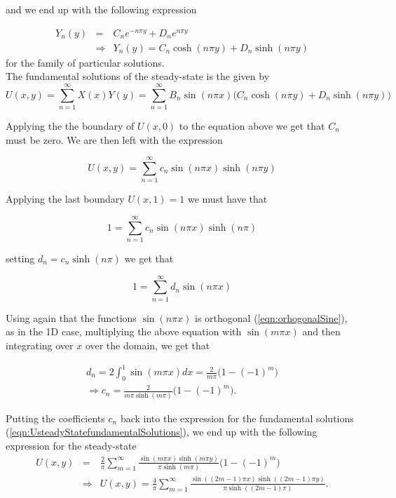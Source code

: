 \documentclass{article}
\begin{document}
and we end up with the following expression

\begin{eqnarray}
Y_n(y) &=& C_ne^{-n\pi y} + D_ne^{n\pi y} \\ 
&\Rightarrow & Y_n(y) = C_n\cosh(n\pi y) + D_n\sinh(n\pi y)
\end{eqnarray}
for the family of particular solutions.
\\

The fundamental solutions of the steady-state is the given by
\begin{equation}
U(x,y) = \sum_{n=1}^{\infty} X(x)Y(y) = \sum_{n=1}^{\infty} B_n\sin(n\pi x)\Big(C_n\cosh(n\pi y) + D_n\sinh(n\pi y)\Big)
\end{equation}

Applying the the boundary of $U(x,0)$ to the equation above we get that $C_n$ must be zero. We are then left with the expression

\begin{equation}
U(x,y) = \sum_{n=1}^{\infty} c_n \sin(n\pi x)\sinh(n\pi y)
\label{eqn:UsteadyStatefundamentalSolutions}
\end{equation}

Applying the last boundary $U(x,1) = 1$ we must have that

\begin{equation}
1 = \sum_{n=1}^{\infty} c_n \sin(n\pi x)\sinh(n\pi)
\end{equation}

setting $d_n = c_n\sinh(n\pi)$ we get that 

\begin{equation}
1 = \sum_{n=1}^{\infty} d_n \sin(n\pi x)
\end{equation}

Using again that the functions $\sin(n\pi x)$ is orthogonal (\ref{eqn:orhogonalSine}), as in the 1D case, multiplying the above equation with $ \sin(m\pi x)$ and  then integrating over $x$ over the domain, we get that 

\begin{subequations}
	\begin{eqnarray}
	d_n = 2\int_0^1 \sin(m\pi x) dx = \frac{2}{m\pi}\Big(1-(-1)^m\Big)\\
	\Rightarrow c_n = \frac{2}{m\pi \sinh(m\pi)}\Big(1-(-1)^m\Big).
	\end{eqnarray}
\end{subequations}

Putting the coefficients $c_n$ back into the expression for the fundamental solutions (\ref{eqn:UsteadyStatefundamentalSolutions}), we end up with the following expression for the steady-state
\begin{subequations}
	\begin{eqnarray}
	U(x,y) &=& \frac{2}{\pi} \sum_{m=1}^{\infty} \frac{\sin(m\pi x)\sinh(m\pi y)}{\pi \sinh(m\pi)}\Big(1-(-1)^m \Big)\\ 
	&\Rightarrow & U(x,y) = \frac{4}{\pi} \sum_{m=1}^{\infty} \frac{\sin((2m-1)\pi x)\sinh((2m-1)\pi y)}{\pi \sinh((2m-1)\pi)}.
	\end{eqnarray}
\end{subequations}
\end{document}
